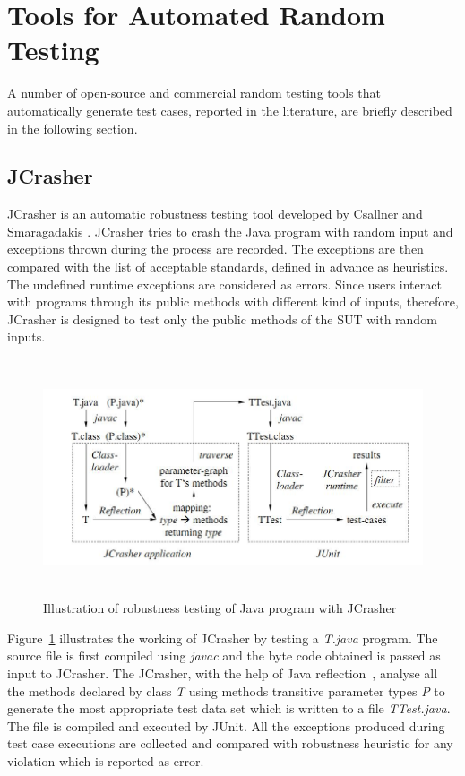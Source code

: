 \section{Tools for Automated Random Testing}
A number of open-source and commercial random testing tools that automatically generate test cases, reported in the literature, are briefly described in the following section.


\subsection{JCrasher}
JCrasher is an automatic robustness testing tool developed by Csallner and Smaragadakis \cite{Pacheco2007b}. JCrasher tries to crash the Java program with random input and exceptions thrown during the process are recorded. The exceptions are then compared with the list of acceptable standards, defined in advance as heuristics. The undefined runtime exceptions are considered as errors. Since users interact with programs through its public methods with different kind of inputs, therefore, JCrasher is designed to test only the public methods of the SUT with random inputs.

\begin{figure}[h]
	\centering
	\includegraphics[width=15cm, height=7cm]{chapter3/JCrasher.png}
	\caption{Illustration of robustness testing of Java program with JCrasher~\cite{Pacheco2007b}}
	\label{fig:JCrasher}
\end{figure}

Figure~\ref{fig:JCrasher} illustrates the working of JCrasher by testing a {\it T.java} program. The source file is first compiled using {\it javac} and the byte code obtained is passed as input to JCrasher. The JCrasher, with the help of Java reflection~\cite{chan1999java}, analyse all the methods declared by class {\it T} using methods transitive parameter types { \it P} to generate the most appropriate test data set which is written to a file {\it TTest.java}. The file is compiled and executed by JUnit. All the exceptions produced during test case executions are collected and compared with robustness heuristic for any violation which is reported as error.\\

